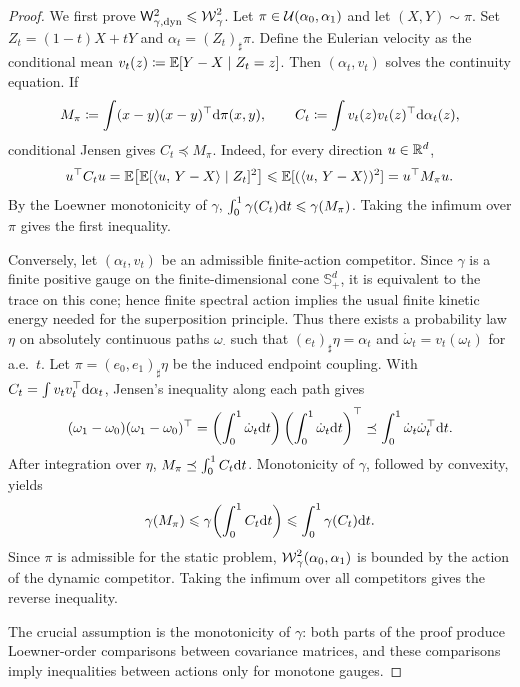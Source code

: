 \begin{proof}
	We first prove $\mathsf W_{\gamma,\mathrm{dyn}}^2\leqslant\operatorname{\mathcal{W}}_\gamma^2$. Let $\pi\in\mathcal{U}(\alpha_0,\alpha_1)$ and let $(X,Y)\sim\pi$. Set $Z_t=(1-t)X+tY$ and $\alpha_t=(Z_t)_\sharp\pi$. Define the Eulerian velocity as the conditional mean
	\(v_t(z)\coloneqq \mathbb{E}[Y-X\mid Z_t=z]\).
	Then $(\alpha_t,v_t)$ solves the continuity equation. If
	\[
		M_\pi\coloneqq\int(x-y)(x-y)^\top\mathrm{d}\pi(x,y),
		\qquad
		C_t\coloneqq\int v_t(z)v_t(z)^\top\mathrm{d}\alpha_t(z),
	\]
	conditional Jensen gives \(C_t\preceq M_\pi\). Indeed, for every direction \(u\in\mathbb{R}^d\),
	\[
		u^\top C_tu
		=
		\mathbb{E}\!\left[\mathbb{E}[\langle u,\,Y-X\rangle\mid Z_t]^2\right]
		\leqslant
		\mathbb{E}[(\langle u,\,Y-X\rangle)^2]
		=
		u^\top M_\pi u.
	\]
	By the Loewner monotonicity of $\gamma$,
	\(\int_0^1\gamma(C_t)\mathrm{d} t \leqslant \gamma(M_\pi)\).
	Taking the infimum over $\pi$ gives the first inequality.

	Conversely, let $(\alpha_t,v_t)$ be an admissible finite-action competitor. Since $\gamma$ is a finite positive gauge on the finite-dimensional cone $\mathbb S_+^d$, it is equivalent to the trace on this cone; hence finite spectral action implies the usual finite kinetic energy needed for the superposition principle. Thus there exists a probability law $\eta$ on absolutely continuous paths $\omega_\cdot$ such that $(e_t)_\sharp\eta=\alpha_t$ and $\dot\omega_t=v_t(\omega_t)$ for a.e.\ \(t\). Let $\pi=(e_0,e_1)_\sharp\eta$ be the induced endpoint coupling. With \(C_t=\int v_tv_t^\top\mathrm{d}\alpha_t\), Jensen's inequality along each path gives
	\[
		(\omega_1-\omega_0)(\omega_1-\omega_0)^\top
		=
		\left(\int_0^1\dot\omega_t\mathrm{d} t\right)
		\left(\int_0^1\dot\omega_t\mathrm{d} t\right)^\top
		\preceq
		\int_0^1\dot\omega_t\dot\omega_t^\top\mathrm{d} t.
	\]
	After integration over $\eta$,
	\(M_\pi\preceq \int_0^1 C_t\mathrm{d} t\).
	Monotonicity of $\gamma$, followed by convexity, yields
	\[
		\gamma(M_\pi)
		\leqslant
		\gamma\!\left(\int_0^1 C_t\mathrm{d} t\right)
		\leqslant
		\int_0^1\gamma(C_t)\mathrm{d} t.
	\]
	Since $\pi$ is admissible for the static problem, $\operatorname{\mathcal{W}}_\gamma^2(\alpha_0,\alpha_1)$ is bounded by the action of the dynamic competitor. Taking the infimum over all competitors gives the reverse inequality.

	The crucial assumption is the monotonicity of $\gamma$: both parts of the proof produce Loewner-order comparisons between covariance matrices, and these comparisons imply inequalities between actions only for monotone gauges.
\end{proof}

